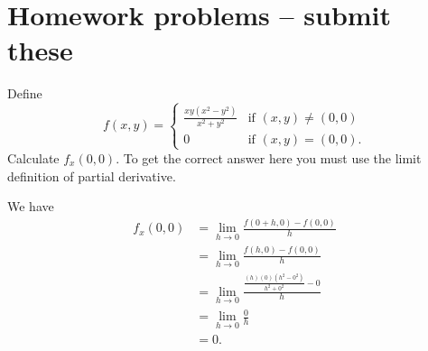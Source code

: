 \newpage

\section{Homework problems -- submit these}

\begin{problem}
  Define
  \[f(x,y)=\begin{cases}
    \frac{xy(x^2-y^2)}{x^2+y^2} &\text{if }(x,y)\neq (0,0)\\
    0&\text{if }(x,y)=(0,0).
  \end{cases}\]
  Calculate $f_x(0,0)$. To get the correct answer here you must use the limit definition of partial derivative.
\end{problem}
\begin{solution}
  We have
  \[\begin{split}
    f_x(0,0) &= \lim_{h\to 0}\frac{f(0+h,0)-f(0,0)}h\\
     &= \lim_{h\to 0}\frac{f(h,0)-f(0,0)}h\\
    &= \lim_{h\to 0}\frac{\frac{(h)(0)(h^2-0^2)}{h^2+0^2}-0}{h}\\
    &= \lim_{h\to 0}\frac{0}{h}\\
    &= 0.
  \end{split}\]
\end{solution}


